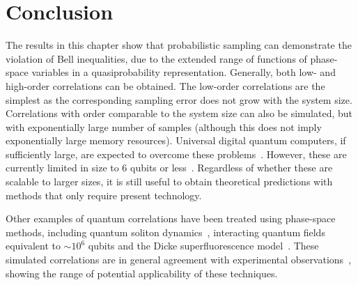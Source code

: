 \section{Conclusion}

The results in this chapter show that probabilistic sampling can demonstrate the violation of Bell inequalities, due to the extended range of functions of phase-space variables in a quasiprobability representation.
Generally, both low- and high-order correlations can be obtained.
The low-order correlations are the simplest as the corresponding sampling error does not grow with the system size.
Correlations with order comparable to the system size can also be simulated, but with exponentially large number of samples (although this does not imply exponentially large memory resources).
Universal digital quantum computers, if sufficiently large, are expected to overcome these problems~\cite{Lloyd1996}.
However, these are currently limited in size to 6 qubits or less~\cite{Lanyon2011}.
Regardless of whether these are scalable to larger sizes, it is still useful to obtain theoretical predictions with methods that only require present technology.

Other examples of quantum correlations have been treated using phase-space methods, including quantum soliton dynamics~\cite{Drummond1993a}, interacting quantum fields~\cite{Deuar2007} equivalent to $\sim10^{6}$ qubits and the Dicke superfluorescence model~\cite{Altland2012}.
These simulated correlations are in general agreement with experimental observations~\cite{Jaskula2010}, showing the range of potential applicability of these techniques.
